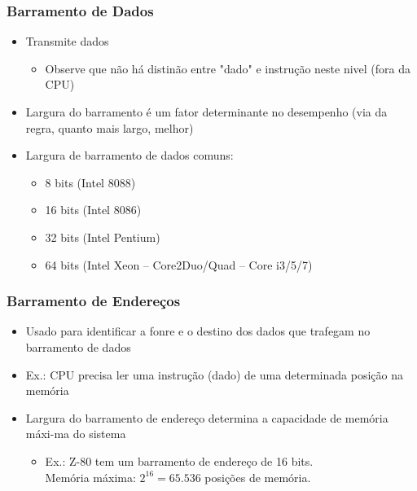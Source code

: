 \documentclass[12pt]{article}
\begin{document}
        \subsubsection{Barramento de Dados}
        \begin{itemize}
            \item Transmite dados
            \begin{itemize}
                \item Observe que não há distinão entre "dado" e instrução neste 
                nivel (fora da CPU)
            \end{itemize}
            \item Largura do barramento é um fator determinante no desempenho (via 
            da regra, quanto mais largo, melhor)
            \item Largura de barramento de dados comuns:
            \begin{itemize}
                \item 8 bits (Intel 8088)
                \item 16 bits (Intel 8086)
                \item 32 bits (Intel Pentium)
                \item 64 bits (Intel Xeon -- Core2Duo/Quad -- Core i3/5/7)
            \end{itemize}
        \end{itemize}
        \subsubsection{Barramento de Endereços}
        \begin{itemize}
            \item Usado para identificar a fonre e o destino dos dados que 
            trafegam no barramento de dados
            \item Ex.: CPU precisa ler uma instrução (dado) de uma determinada 
            posição na memória
            \item Largura do barramento de endereço determina a capacidade de 
            memória máxi-ma do sistema
            \begin{itemize}
                \item Ex.: Z-80 tem um barramento de endereço de 16 bits. \\
                Memória máxima: $2^{16}=65.536$ posições de memória.
            \end{itemize}
        \end{itemize}
\end{document}
